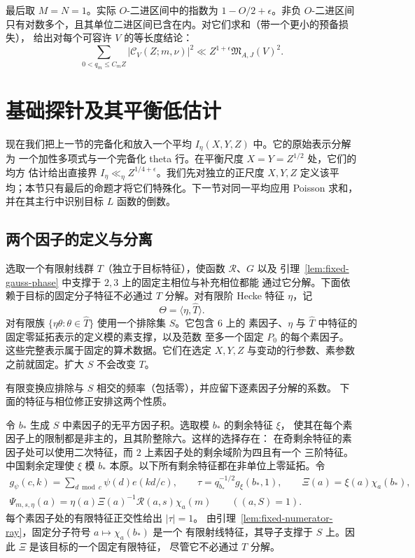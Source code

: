 \documentclass[11pt,a4paper]{article}
\numberwithin{equation}{section}
\numberwithin{figure}{section}
\theoremstyle{definition}
\theoremstyle{remark}
\begin{document}
最后取 $M=N=1$。实际 $O$-二进区间中的指数为 $1-O/2+\epsilon$。非负 $O$-二进区间
只有对数多个，且其单位二进区间已含在内。对它们求和（带一个更小的预备损失），
给出对每个可容许 $V$ 的等长度结论：
\begin{equation}\label{eq:unmarked-balanced-completed-moment}
 \sum_{0<q_m\le C_mZ}|\mathcal C_V(Z;m,\nu)|^2
 \ll Z^{1+\epsilon}\mathfrak M_{A,J}(V)^2.
\end{equation}

\section{基础探针及其平衡低估计}\label{sec:probe}

现在我们把上一节的完备化和放入一个平均 $I_\eta(X,Y,Z)$ 中。它的原始表示分解为
一个加性多项式与一个完备化 theta 行。在平衡尺度 $X=Y=Z^{1/2}$ 处，它们的均方
估计给出直接界 $I_\eta\ll_\eta Z^{1/4+\epsilon}$。我们先对独立的正尺度 $X,Y,Z$
定义该平均；本节只有最后的命题才将它们特殊化。下一节对同一平均应用 Poisson 求和，
并在其主行中识别目标 $L$ 函数的倒数。

\subsection{两个因子的定义与分离}

选取一个有限射线群 $T$（独立于目标特征），使函数 $\mathcal R$、$G$ 以及
引理~\ref{lem:fixed-gauss-phase} 中支撑于 $2,3$ 上的固定主相位与补充相位都能
通过它分解。下面依赖于目标的固定分子特征不必通过 $T$ 分解。对有限阶 Hecke
特征 $\eta$，记
\[
 \Theta=\langle\eta,\widehat T\rangle.
\]
对有限族 $\{\eta\theta:\theta\in\widehat T\}$ 使用一个排除集 $S$。它包含 $6$ 上的
素因子、$\eta$ 与 $\widehat T$ 中特征的固定零延拓表示的定义模的素支撑，以及范数
至多一个固定 $P_0$ 的每个素因子。这些完整表示属于固定的算术数据。它们在选定
$X,Y,Z$ 与变动的行参数、素参数之前就固定。扩大 $S$ 不会改变 $T$。

有限变换应排除与 $S$ 相交的频率（包括零），并应留下逐素因子分解的系数。
下面的特征与相位修正安排这两个性质。

令 $b_*$ 生成 $S$ 中素因子的无平方因子积。选取模 $b_*$ 的剩余特征 $\xi$，
使其在每个素因子上的限制都是非主的，且其阶整除六。这样的选择存在：
在奇剩余特征的素因子处可以使用二次特征，而 $2$ 上素因子处的剩余域阶为四且有一个
三阶特征。中国剩余定理使 $\xi$ 模 $b_*$ 本原。以下所有剩余特征都在非单位上零延拓。令
\[
 \begin{gathered}
 g_\psi(c,k)=\sum_{d\bmod c}\psi(d)e(kd/c),\qquad
 \tau=q_{b_*}^{-1/2}g_\xi(b_*,1),\qquad
 \Xi(a)=\xi(a)\chi_a(b_*),\\
 \Psi_{m,s,\eta}(a)=
       \eta(a)\Xi(a)^{-1}\mathcal R(a,s)\chi_a(m)
       \qquad ((a,S)=1).
 \end{gathered}
\]
每个素因子处的有限特征正交性给出 $|\tau|=1$。
由引理~\ref{lem:fixed-numerator-ray}，固定分子符号 $a\mapsto\chi_a(b_*)$ 是一个
有限射线特征，其导子支撑于 $S$ 上。因此 $\Xi$ 是该目标的一个固定有限特征，
尽管它不必通过 $T$ 分解。
\end{document}

